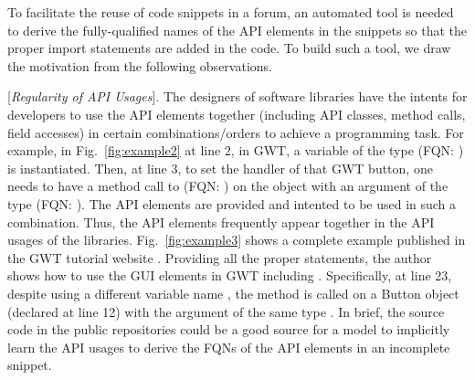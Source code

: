 To facilitate the reuse of code snippets in a forum, an automated tool
is needed to derive the fully-qualified names of the API elements in
the snippets so that the proper import statements are added in the
code. To build such a tool, we draw the motivation from the following
observations.

\vspace{2pt}
 [{\em Regularity of API Usages}]. The
designers of software libraries have the intents for developers to use
the API elements together (including API classes, method calls, field
accesses) in certain combinations/orders to achieve a programming
task. For example, in Fig.~\ref{fig:example2} at line 2, in GWT, a
variable of the type  (FQN:
) is instantiated. Then, at
line 3, to set the handler of that GWT button, one needs to have a
method call to  (FQN:
) on
the  object with an argument of the type
 (FQN:
). The
API elements are provided and intented to be used in such a
combination. Thus, the API elements frequently appear together in the
API usages of the libraries. Fig.~\ref{fig:example3} shows a complete
example published in the GWT tutorial website
. Providing all the proper 
statements, the author shows how to use the GUI elements in GWT
including . Specifically, at line 23, despite using a
different variable name , the method
 is called on a Button object (declared at line
12) with the argument of the same type . In brief,
the source code in the public repositories could be a good source for
a model to implicitly learn the API usages to derive the FQNs of the
API elements in an incomplete snippet.



